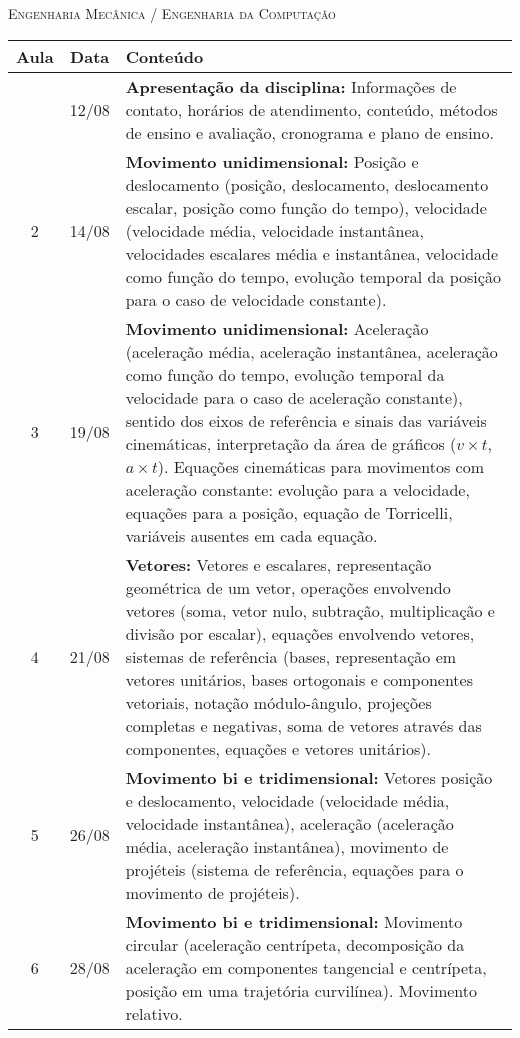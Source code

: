 \vspace{1cm}
\begin{center}
\Large\textsc{Engenharia Mecânica / Engenharia da Computação}
\end{center}
\begin{center}
\begin{longtable}{ccp{70mm}}
\toprule
Aula & Data & Conteúdo \\
\midrule
\endhead
\bottomrule
\endfoot
  1 & 12/08 & \textbf{Apresentação da disciplina:} Informações de contato, horários de atendimento, conteúdo, métodos de ensino e avaliação, cronograma e plano de ensino.\\
  2 & 14/08 & \textbf{Movimento unidimensional:} Posição e deslocamento (posição, deslocamento, deslocamento escalar, posição como função do tempo), velocidade (velocidade média, velocidade instantânea, velocidades escalares média e instantânea, velocidade como função do tempo, evolução temporal da posição para o caso de velocidade constante).\\
  3 & 19/08 & \textbf{Movimento unidimensional:} Aceleração (aceleração média, aceleração instantânea, aceleração como função do tempo, evolução temporal da velocidade para o caso de aceleração constante), sentido dos eixos de referência e sinais das variáveis cinemáticas, interpretação da área de gráficos ($v \times t$, $a \times  t$). Equações cinemáticas para movimentos com aceleração constante: evolução para a velocidade, equações para a posição, equação de Torricelli, variáveis ausentes em cada equação.\\
  4 & 21/08 & \textbf{Vetores:} Vetores e escalares, representação geométrica de um vetor, operações envolvendo vetores (soma, vetor nulo, subtração, multiplicação e divisão por escalar), equações envolvendo vetores, sistemas de referência (bases, representação em vetores unitários, bases ortogonais e componentes vetoriais, notação módulo-ângulo, projeções completas e negativas, soma de vetores através das componentes, equações e vetores unitários). \\
  5 & 26/08 & \textbf{Movimento bi e tridimensional:} Vetores posição e deslocamento, velocidade (velocidade média, velocidade instantânea), aceleração (aceleração média, aceleração instantânea), movimento de projéteis (sistema de referência, equações para o movimento de projéteis). \\
  6 & 28/08 & \textbf{Movimento bi e tridimensional:} Movimento circular (aceleração centrípeta, decomposição da aceleração em componentes tangencial e centrípeta, posição em uma trajetória curvilínea). Movimento relativo.\\

\end{longtable}
\end{center}
